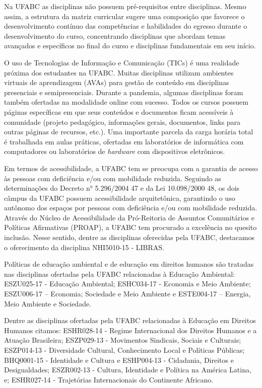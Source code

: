 Na UFABC as disciplinas não possuem pré-requisitos entre disciplinas. Mesmo assim, a estrutura da matriz curricular sugere uma composição
que favorece o desenvolvimento contínuo das competências e habilidades do egresso durante o desenvolvimento do curso, concentrando 
disciplinas que abordam temas avançados e específicos no final do curso e disciplinas fundamentais em seu início.

O uso de Tecnologias de Informação e Comunicação (TICs) é uma realidade próxima dos estudantes na UFABC. Muitas disciplinas
utilizam ambientes virtuais de aprendizagem (AVAs) para gestão de conteúdo em disciplinas presenciais e semipresenciais. Durante
a pandemia, algumas disciplinas foram também ofertadas na modalidade online com sucesso. Todos os cursos possuem páginas 
específicas em que seus conteúdos e documentos ficam acessíveis à comunidade (projeto pedagógico, informações gerais, documentos, links para outras páginas de recursos, etc.). Uma importante parcela da carga horária total é trabalhada em aulas práticas, ofertadas em laboratórios de informática com computadores ou laboratórios de {\it hardware} com dispositivos eletrônicos.


Em termos de acessibilidade, a UFABC tem se preocupa com a garantia de acesso às
pessoas com deficiência e/ou com mobilidade reduzida. Seguindo as determinações do
Decreto n° 5.296/2004 47 e da Lei 10.098/2000 48, os dois câmpus da UFABC possuem
acessibilidade arquitetônica, garantindo o uso autônomo dos espaços por pessoas com
deficiência e/ou com mobilidade reduzida. Através do Núcleo de Acessibilidade da Pró-Reitoria
de Assuntos Comunitários e Políticas Afirmativas (PROAP), a UFABC tem procurado a
excelência no quesito inclusão. Nesse sentido, dentre as disciplinas oferecidas pela UFABC,
destacamos o oferecimento da disciplina NHI5010-15 - LIBRAS.

Políticas de educação ambiental e de educação em direitos humanos são tratadas 
nas disciplinas ofertadas pela UFABC relacionadas à Educação Ambiental: 
ESZU025-17 - Educação Ambiental; ESHC034-17 - Economia e Meio Ambiente; 
ESZU006-17 – Economia; Sociedade e Meio Ambiente e
ESTE004-17 – Energia, Meio Ambiente e Sociedade.

Dentre as disciplinas ofertadas pela UFABC relacionadas à Educação em Direitos
Humanos citamos: ESHR028-14 - Regime Internacional dos Direitos Humanos e a Atuação
Brasileira; ESZP029-13 - Movimentos Sindicais, Sociais e Culturais; ESZP014-13 - Diversidade
Cultural, Conhecimento Local e Políticas Públicas; BHQ0001-15 - Identidade e Cultura e
ESHP004-13 - Cidadania, Direitos e Desigualdades; ESZR002-13 - Cultura, Identidade e
Política na América Latina, e; ESHR027-14 - Trajetórias Internacionais do Continente Africano.




